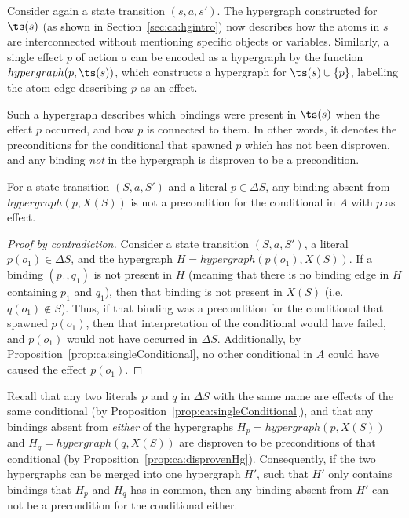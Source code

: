 \documentclass[\master/Master.tex]{subfiles}
\begin{document}
Consider again a state transition $\left( s, a, s' \right)$. The hypergraph constructed for $\ts(s)$ (as shown in Section~\ref{sec:ca:hgintro}) now describes how the atoms in $s$ are interconnected without mentioning specific objects or variables. Similarly, a single effect $p$ of action $a$ can be encoded as a hypergraph by the function $hypergraph(p,\ts(s))$, which constructs a hypergraph for $\ts(s) \cup \{p\}$, labelling the atom edge describing $p$ as an effect.

Such a hypergraph describes which bindings were present in $\ts(s)$ when the effect $p$ occurred, and how $p$ is connected to them. In other words, it denotes the preconditions for the conditional that spawned $p$ which has not been disproven, and any binding \textit{not} in the hypergraph is disproven to be a precondition.

\begin{proposition}\label{prop:ca:disprovenHg}
    For a state transition $\left( S, a, S' \right)$ and a literal $p \in \Delta S$, any binding absent from $hypergraph \left( p, X(S) \right)$ is not a precondition for the conditional in $A$ with $p$ as effect. 
\end{proposition}

\begin{proof}[Proof by contradiction]
    Consider a state transition $\left( S, a, S' \right)$, a literal $p \left( o_1 \right) \in \Delta S$, and the hypergraph $H = hypergraph\left( p\left(o_1\right), X(S) \right)$. If a binding $(p_1, q_1)$ is not present in $H$ (meaning that there is no binding edge in $H$ containing $p_1$ and $q_1$), then that binding is not present in $X(S)$ (i.e.\ $q\left(o_1\right) \notin S$). Thus, if that binding was a precondition for the conditional that spawned $p\left(o_1\right)$, then that interpretation of the conditional would have failed, and $p\left( o_1 \right)$ would not have occurred in $\Delta S$. Additionally, by Proposition~\ref{prop:ca:singleConditional}, no other conditional in $A$ could have caused the effect $p \left(o_1\right)$.
\end{proof}

Recall that any two literals $p$ and $q$ in $\Delta S$ with the same name are effects of the same conditional (by Proposition~\ref{prop:ca:singleConditional}), and that any bindings absent from \textit{either} of the hypergraphs $H_p = hypergraph(p, X(S))$ and $H_q = hypergraph(q, X(S))$ are disproven to be preconditions of that conditional (by Proposition~\ref{prop:ca:disprovenHg}). Consequently, if the two hypergraphs can be merged into one hypergraph $H'$, such that $H'$ only contains bindings that $H_p$ and $H_q$ has in common, then any binding absent from $H'$ can not be a precondition for the conditional either. 
\end{document}
